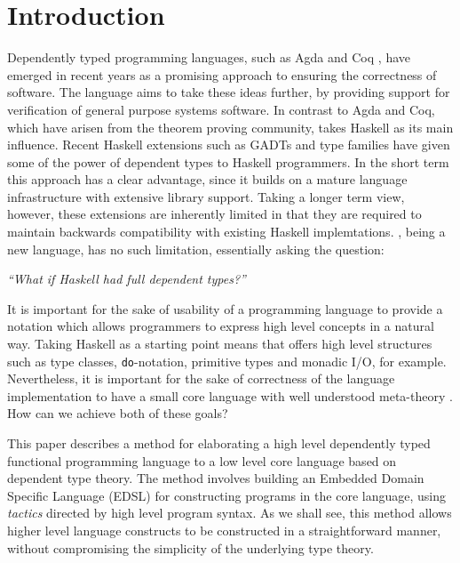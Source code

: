 \section{Introduction}

Dependently typed programming languages, such as Agda \cite{norell2007thesis}
and Coq \cite{Bertot2004}, have emerged in recent years as a promising approach
to ensuring the correctness of software. The \Idris{} language
\cite{Brady2011a} aims to take these ideas further, by providing support for
verification of general purpose systems software. In contrast to Agda and Coq,
which have arisen from the theorem proving community, \Idris{} takes Haskell as
its main influence.  Recent Haskell extensions such as GADTs and type families have
given some of the power of dependent types to Haskell programmers. In the short
term this approach has a clear advantage, since it builds on a mature language
infrastructure with extensive library support.
Taking a longer term view, however,
these extensions are inherently limited in that they are required to maintain
backwards compatibility with existing Haskell implemtations.  \Idris{}, being a new
language, has no such limitation, essentially asking the question:

\begin{center}
\emph{``What if Haskell had \emph{full} dependent types?''}
\end{center}

It is important for the sake of usability of a programming language to provide
a notation which allows programmers to express high level concepts
in a natural way. Taking Haskell as a starting point means that \Idris{} offers
high level structures such as type classes, \texttt{do}-notation, primitive types
and monadic I/O, for example.
Nevertheless, it is important for the sake of correctness of the language implementation
to have a small core language with well understood meta-theory
\cite{Altenkirch2010}.  
How can we achieve both of these goals?

This paper describes a method for elaborating a high level dependently typed
functional programming language to a low level core language based on dependent
type theory.  The method involves building an Embedded Domain Specific Language
(EDSL) for constructing programs in the core language, using \emph{tactics}
directed by high level program syntax.  
As we shall see, this method allows higher level language constructs to be
constructed in a straightforward manner, without compromising the simplicity
of the underlying type theory.

